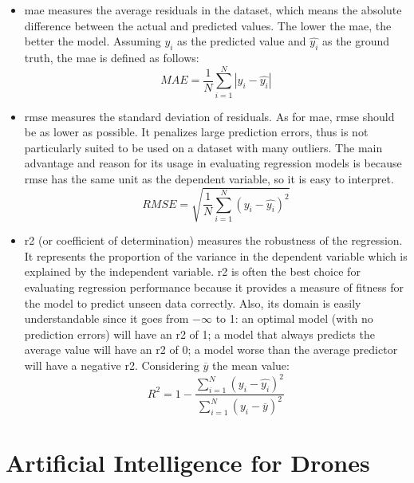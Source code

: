 \begin{itemize}
	\item \gls{mae} measures the average residuals in the dataset, which means the absolute difference between the actual and predicted values. The lower the \gls{mae}, the better the model. Assuming $y_i$ as the predicted value and $\hat{y_i}$ as the ground truth, the \gls{mae} is defined as follows:
	$$ MAE = \frac{1}{N} \sum_{i=1}^N |y_i - \hat{y_i}| $$
	
	\item \gls{rmse} measures the standard deviation of residuals. As for \gls{mae}, \gls{rmse} should be as lower as possible. It penalizes large prediction errors, thus is not particularly suited to be used on a dataset with many outliers. The main advantage and reason for its usage in evaluating regression models is because \gls{rmse} has the same unit as the dependent variable, so it is easy to interpret.
	$$ RMSE = \sqrt{\frac{1}{N} \sum_{i=1}^N (y_i - \hat{y_i})^2} $$
	
	\item \gls{r2} (or coefficient of determination) measures the robustness of the regression. It represents the proportion of the variance in the dependent variable which is explained by the independent variable. \gls{r2} is often the best choice for evaluating regression performance because it provides a measure of fitness for the model to predict unseen data correctly. Also, its domain is easily understandable since it goes from $-\infty$ to 1: an optimal model (with no prediction errors) will have an \gls{r2} of 1; a model that always predicts the average value will have an \gls{r2} of 0; a model worse than the average predictor will have a negative \gls{r2}. Considering $\overline{y}$ the mean value:
	$$ R^2 = 1 - \frac{\sum_{i=1}^N (y_i - \hat{y_i})^2}{\sum_{i=1}^N (y_i - \overline{y})^2} $$
\end{itemize}


%




\section{Artificial Intelligence for Drones}
\label{sec:human-drone-interaction}

